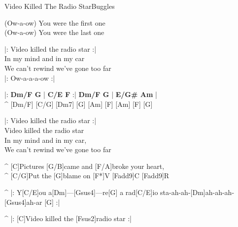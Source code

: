 \begin{song}{Video Killed The Radio Star}{Buggles}
\begin{guitar}
(Ow-a-ow) You were the first one \\
(Ow-a-ow) You were the last one \\
\end{guitar}


\begin{guitar}
|: Video killed the radio star :|\\
In my mind and in my car\\
We can't rewind we've gone too far \\
|: Ow-a-a-a-ow :|\\
\end{guitar}

\begin{guitar}
|: \textbf{Dm/F G} | \textbf{C/E F} :| \textbf{Dm/F G} | \textbf{E/G# Am} |\\
^ [Dm/F] [C/G] [Dm7] [G] [Am] [F] [Am] [F] [G]\\
\end{guitar}

\begin{guitar}
|: Video killed the radio star :|\\
Video killed the radio star \\
In my mind and in my car, \\
We can't rewind we've gone too far \\
\end{guitar}

\begin{guitar}
^ [C]Pictures [G/B]came and [F/A]broke your heart, \\
^ [C/G]Put the [G]blame on [F*]V   [Fadd9]C     [Fadd9]R \\
\end{guitar}

\begin{guitar}
^ |: Y[C/E]ou a[Dm]---[Gsus4]---re[G] a rad[C/E]io sta-ah-ah-[Dm]ah-ah-ah-[Gsus4]ah-ar  [G]  :|\\
\end{guitar}

\begin{guitar}
^ |: [C]Video killed the [Fsus2]radio star :|\\
\end{guitar}
\end{song}
